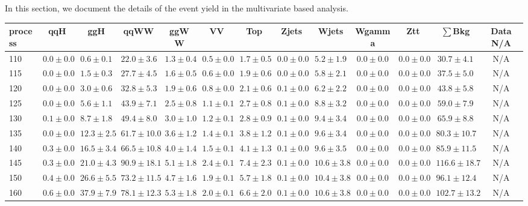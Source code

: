 In this section, we document the details of the event yield in 
the multivariate based analysis.

\begin{table}
{%
 \tiny
 \begin{center}
 \begin{tabular}{l | c c | c c c c c c c c  | c c}
 \hline
 process & qqH & ggH & qqWW & ggWW & VV & Top & Zjets & Wjets & Wgamma & Ztt & $\sum$Bkg & Data N/A \\
 \hline
110 & $0.0\pm0.0$ & $0.6\pm0.1$ & $22.0\pm3.6$ & $1.3\pm0.4$ & $0.5\pm0.0$ & $1.7\pm0.5$ & $0.0\pm0.0$ & $5.2\pm1.9$ & $0.0\pm0.0$ & $0.0\pm0.0$ & $30.7\pm4.1$ &  N/A \\
115 & $0.0\pm0.0$ & $1.5\pm0.3$ & $27.7\pm4.5$ & $1.6\pm0.5$ & $0.6\pm0.0$ & $1.9\pm0.6$ & $0.0\pm0.0$ & $5.8\pm2.1$ & $0.0\pm0.0$ & $0.0\pm0.0$ & $37.5\pm5.0$ &  N/A \\
120 & $0.0\pm0.0$ & $3.0\pm0.6$ & $32.8\pm5.3$ & $1.9\pm0.6$ & $0.8\pm0.0$ & $2.1\pm0.6$ & $0.1\pm0.0$ & $6.2\pm2.2$ & $0.0\pm0.0$ & $0.0\pm0.0$ & $43.8\pm5.8$ &  N/A \\
125 & $0.0\pm0.0$ & $5.6\pm1.1$ & $43.9\pm7.1$ & $2.5\pm0.8$ & $1.1\pm0.1$ & $2.7\pm0.8$ & $0.1\pm0.0$ & $8.8\pm3.2$ & $0.0\pm0.0$ & $0.0\pm0.0$ & $59.0\pm7.9$ &  N/A \\
130 & $0.1\pm0.0$ & $8.7\pm1.8$ & $49.4\pm8.0$ & $3.0\pm1.0$ & $1.2\pm0.1$ & $2.8\pm0.9$ & $0.1\pm0.0$ & $9.4\pm3.4$ & $0.0\pm0.0$ & $0.0\pm0.0$ & $65.9\pm8.8$ &  N/A \\
135 & $0.0\pm0.0$ & $12.3\pm2.5$ & $61.7\pm10.0$ & $3.6\pm1.2$ & $1.4\pm0.1$ & $3.8\pm1.2$ & $0.1\pm0.0$ & $9.6\pm3.4$ & $0.0\pm0.0$ & $0.0\pm0.0$ & $80.3\pm10.7$ &   N/A \\
140 & $0.3\pm0.0$ & $16.5\pm3.4$ & $66.5\pm10.8$ & $4.0\pm1.4$ & $1.5\pm0.1$ & $4.1\pm1.3$ & $0.1\pm0.0$ & $9.6\pm3.5$ & $0.0\pm0.0$ & $0.0\pm0.0$ & $85.9\pm11.5$ &   N/A \\
145 & $0.3\pm0.0$ & $21.0\pm4.3$ & $90.9\pm18.1$ & $5.1\pm1.8$ & $2.4\pm0.1$ & $7.4\pm2.3$ & $0.1\pm0.0$ & $10.6\pm3.8$ & $0.0\pm0.0$ & $0.0\pm0.0$ & $116.6\pm18.7$ &  N/A \\
150 & $0.4\pm0.0$ & $26.6\pm5.5$ & $73.2\pm11.5$ & $4.7\pm1.6$ & $1.9\pm0.1$ & $5.7\pm1.8$ & $0.1\pm0.0$ & $10.4\pm3.8$ & $0.0\pm0.0$ & $0.0\pm0.0$ & $96.1\pm12.4$ &  N/A \\
160 & $0.6\pm0.0$ & $37.9\pm7.9$ & $78.1\pm12.3$ & $5.3\pm1.8$ & $2.0\pm0.1$ & $6.6\pm2.0$ & $0.1\pm0.0$ & $10.6\pm3.8$ & $0.0\pm0.0$ & $0.0\pm0.0$ & $102.7\pm13.2$ &  N/A \\

\end{tabular}
\end{center}}
\end{table}

